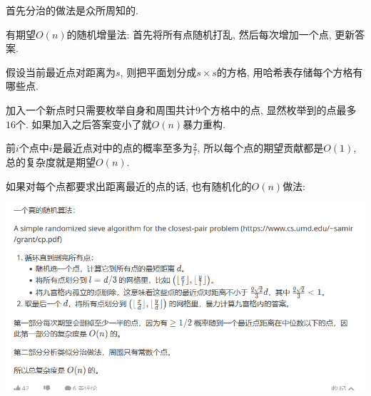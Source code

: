 首先分治的做法是众所周知的.

有期望$O(n)$的随机增量法: 首先将所有点随机打乱, 然后每次增加一个点, 更新答案.

假设当前最近点对距离为$s$, 则把平面划分成$s \times s$的方格, 用哈希表存储每个方格有哪些点.

加入一个新点时只需要枚举自身和周围共计$9$个方格中的点, 显然枚举到的点最多$16$个. 如果加入之后答案变小了就$O(n)$暴力重构.

前$i$个点中$i$是最近点对中的点的概率至多为$\frac 2 i$, 所以每个点的期望贡献都是$O(1)$, 总的复杂度就是期望$O(n)$.

如果对每个点都要求出距离最近的点的话, 也有随机化的$O(n)$做法:

\includegraphics[scale=0.5]{../src/geometry/最近点对.png}